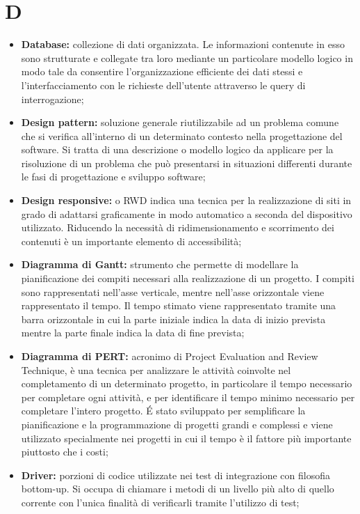 \section*{D} %
\label{sec:d}
	\begin{itemize}
		\item \textbf{Database:} collezione di dati organizzata. Le informazioni contenute in esso sono strutturate e collegate tra loro mediante un particolare modello logico in modo tale da consentire l'organizzazione efficiente dei dati stessi e l'interfacciamento con le richieste dell'utente attraverso le query di interrogazione;
		\item \textbf{Design pattern:} soluzione generale riutilizzabile ad un problema comune che si verifica all'interno di un determinato contesto nella progettazione del software. Si tratta di una descrizione o modello logico da applicare per la risoluzione di un problema che può presentarsi in situazioni differenti durante le fasi di progettazione e sviluppo software;
		\item \textbf{Design responsive:} o RWD indica una tecnica per la realizzazione di siti in grado di adattarsi graficamente in modo automatico a seconda del dispositivo utilizzato. Riducendo la necessità di ridimensionamento e scorrimento dei contenuti è un importante elemento di accessibilità;
		\item \textbf{Diagramma di Gantt:} strumento che permette di modellare la pianificazione dei compiti necessari alla realizzazione di un progetto. I compiti sono rappresentati nell'asse verticale, mentre nell'asse orizzontale viene rappresentato il tempo. Il tempo stimato viene rappresentato tramite una barra orizzontale in cui la parte iniziale indica la data di inizio prevista mentre la parte finale indica la data di fine prevista;
		\item \textbf{Diagramma di PERT:} acronimo di Project Evaluation and Review Technique, è una tecnica per analizzare le attività coinvolte nel completamento di un determinato progetto, in particolare il tempo necessario per completare ogni attività, e per identificare il tempo minimo necessario per completare l'intero progetto. É stato sviluppato per semplificare la pianificazione e la programmazione di progetti grandi e complessi e viene utilizzato specialmente nei progetti in cui il tempo è il fattore più importante piuttosto che i costi;
		\item \textbf{Driver:} porzioni di codice utilizzate nei test di integrazione con filosofia bottom-up. Si occupa di chiamare i metodi di un livello più alto di quello corrente con l'unica finalità di verificarli tramite l'utilizzo di test;
	\end{itemize}
\pagebreak

